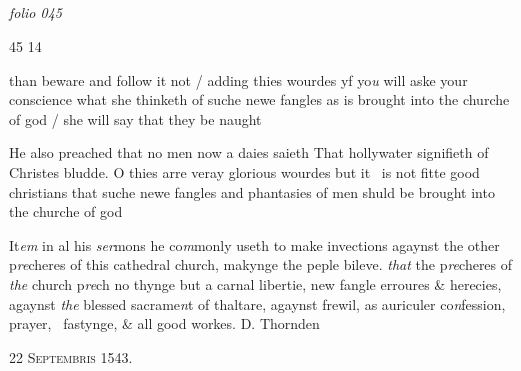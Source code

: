 \documentclass[12pt, a4paper]{book}
\begin{document}
\dotfill
					  \subsection*{}

\textit{folio 045}


\begin{flushright}{\color{Mahogany}45} 14\end{flushright}

				\marginpar[\vspace{0.5cm}{\textcolor{Gray}{n}}]{}
			
		\ifthenelse{\isodd{\thepage}}
		{\reversemarginpar}
		{\normalmarginpar}
		than beware and follow it not / adding thies wourdes
 yf yo\textit{u} will aske your conscience what she thinketh
 of suche newe fangles as is brought into the
 churche of god / she will say that they be naught
	
				\marginpar[\vspace{0.5cm}{\textcolor{Gray}{seditious n}}]{}
			
		
				\marginpar[\vspace{0.5cm}{\textcolor{Gray}{n}}]{}
			
		
		\ifthenelse{\isodd{\thepage}}
		{\reversemarginpar}
		{\normalmarginpar}
		He also preached that no men now a daies saieth
 That hollywater signifieth of Christes bludde.
 O thies arre veray glorious wourdes but it 
 is not fitte good christians that suche newe
 fangles and phantasies of men shuld be brought
 into the churche of god
 
		\ifthenelse{\isodd{\thepage}}
		{\reversemarginpar}
		{\normalmarginpar}
		It\textit{em} in al his \textit{ser}mons he co\textit{m}monly useth to make invections agaynst
 the other p\textit{re}cheres of this cathedral church, makynge the peple bileve.
 	\textit{that} the p\textit{re}cheres of \textit{the} church p\textit{re}ch no thynge but a carnal libertie, new fangle
 erroures \& herecies, agaynst \textit{the} blessed sacrame\textit{n}t of thaltare, agaynst frewil,
 as auriculer co\textit{n}fession, prayer, 
 fastynge, \& all good workes.
 D. Thornden
			
 

            
            
               
				\begin{center} \begin{large} {\scshape 
                  22 Septembris 1543.} \end{large} \end{center}
			
\end{document}
